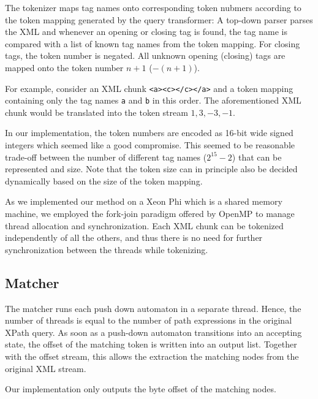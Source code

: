 The tokenizer maps tag names onto corresponding token nubmers according to the
token mapping generated by the query transformer: A top-down parser parses the
XML and whenever an opening or closing tag is found, the tag name is compared
with a list of known tag names from the token mapping. For closing tags, the
token number is negated. All unknown opening (closing) tags are mapped onto
the token number $n+1$ ($-(n+1)$).

For example, consider an XML chunk \verb;<a><c></c></a>; and a token mapping
containing only the tag names \verb;a; and \verb;b; in this order. The
aforementioned XML chunk would be translated into the token stream $1, 3, -3,
-1$.

In our implementation, the token numbers are encoded as 16-bit wide signed
integers which seemed like a good compromise. This seemed to be reasonable
trade-off between the number of different tag names ($2^15-2$) that can be
represented and size. Note that the token size can in principle also be decided
dynamically based on the size of the token mapping.

As we implemented our method on a Xeon Phi  which is a
shared memory machine, we employed the fork-join paradigm offered by OpenMP
 to manage thread allocation and synchronization. Each XML chunk
can be tokenized independently of all the others, and thus there is no need for
further synchronization between the threads while tokenizing. 

\subsection{Matcher}

The matcher runs each push down automaton in a separate thread. Hence, the
number of threads is equal to the number of path expressions in the original
XPath query. As soon as a push-down automaton transitions into an accepting
state, the offset of the matching token is written into an output list.
Together with the offset stream, this allows the extraction the matching nodes
from the original XML stream.

Our implementation only outputs the byte offset of the matching nodes.




